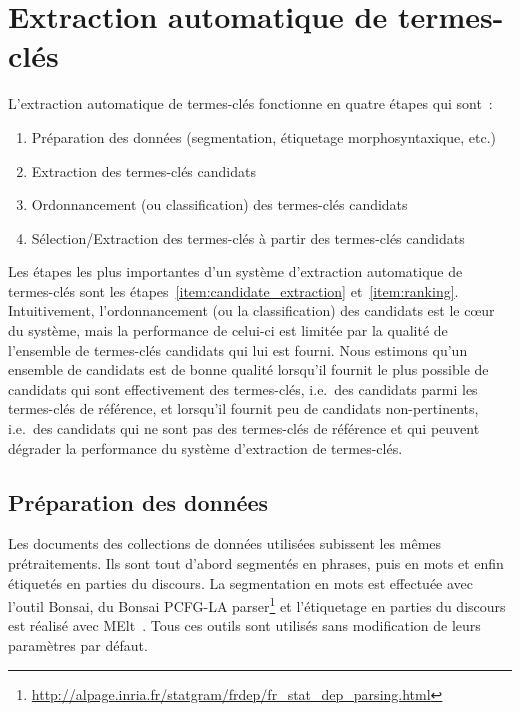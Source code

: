 \section{Extraction automatique de termes-clés}
\label{sec:extraction_automatique_de_termes_cles}
  L'extraction automatique de termes-clés fonctionne en quatre étapes qui sont~:
  \begin{enumerate}
    \item{Préparation des données (segmentation, étiquetage morphosyntaxique,
          etc.)
          \label{item:preprocessing}}
    \item{Extraction des termes-clés candidats
          \label{item:candidate_extraction}}
    \item{Ordonnancement (ou classification) des termes-clés candidats
          \label{item:ranking}}
    \item{Sélection/Extraction des termes-clés à partir des termes-clés
          candidats
          \label{item:extraction}}
  \end{enumerate}
  Les étapes les plus importantes d'un système d'extraction automatique de
  termes-clés sont les étapes~\ref{item:candidate_extraction}
  et~\ref{item:ranking}. Intuitivement, l'ordonnancement (ou la classification)
  des candidats est le c\oe{}ur du système, mais la performance de celui-ci est
  limitée par la qualité de l'ensemble de termes-clés candidats qui lui est
  fourni. Nous estimons qu'un ensemble de candidats est de bonne qualité
  lorsqu'il fournit le plus possible de candidats qui sont effectivement des
  termes-clés, i.e.~des candidats parmi les termes-clés de référence, et
  lorsqu'il fournit peu de candidats non-pertinents, i.e.~des candidats qui ne
  sont pas des termes-clés de référence et qui peuvent dégrader la performance
  du système d'extraction de termes-clés.

  \subsection{Préparation des données}
  \label{subsec:preparation_des_donnees}
    Les documents des collections de données utilisées subissent les mêmes
    prétraitements. Ils sont tout d'abord segmentés en phrases, puis en mots et
    enfin étiquetés en parties du discours. La segmentation en mots est
    effectuée avec l'outil Bonsai, du Bonsai PCFG-LA
    parser\footnote{\url{http://alpage.inria.fr/statgram/frdep/fr_stat_dep_parsing.html}}
    et l'étiquetage en parties du discours est réalisé avec
    MElt~\cite{denis2009melt}. Tous ces outils sont utilisés sans modification
    de leurs paramètres par défaut.

